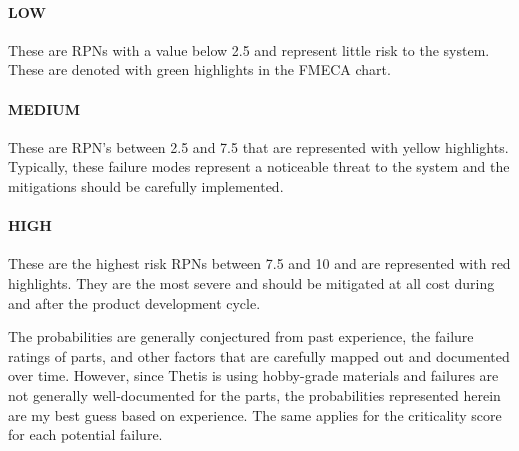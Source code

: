 \paragraph*{LOW} These are RPNs with a value below 2.5 and represent little risk to the system. 
These are denoted with green highlights in the FMECA chart.

\paragraph*{MEDIUM} These are RPN's between 2.5 and 7.5 that are represented with yellow highlights.
Typically, these failure modes represent a noticeable threat to the system and the mitigations should be carefully implemented.

\paragraph*{HIGH} These are the highest risk RPNs between 7.5 and 10 and are represented with red highlights.
They are the most severe and should be mitigated at all cost during and after the product development cycle.

The probabilities are generally conjectured from past experience, the failure ratings of parts, and other factors that are carefully mapped out and documented over time.
However, since Thetis is using hobby-grade materials and failures are not generally well-documented for the parts, the probabilities represented herein are my best guess based on experience.
The same applies for the criticality score for each potential failure.


